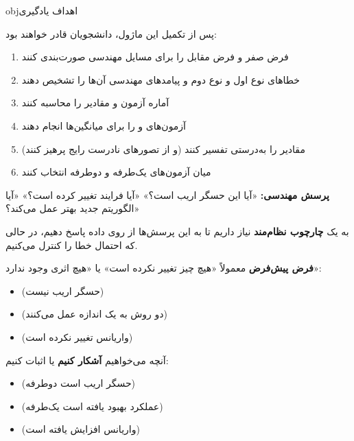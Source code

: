 \begin{PSbox}[unbreakable]{obj}{اهداف یادگیری}

پس از تکمیل این ماژول، دانشجویان قادر خواهند بود:

\begin{enumerate}
\def\labelenumi{\arabic{enumi}.}
\tightlist
\item
  فرض صفر و فرض مقابل را برای مسایل مهندسی صورت‌بندی کنند
\item
  خطاهای نوع اول و نوع دوم و پیامدهای مهندسی آن‌ها را تشخیص دهند
\item
  آماره آزمون و مقادیر  را محاسبه کنند
\item
  آزمون‌های  و  را برای میانگین‌ها انجام دهند
\item
  مقادیر  را به‌درستی تفسیر کنند (و از تصورهای نادرست رایج پرهیز کنند)
\item
  میان آزمون‌های یک‌طرفه و دوطرفه انتخاب کنند
\end{enumerate}

\end{PSbox}


\textbf{پرسش مهندسی:} «آیا این حسگر اریب است؟» «آیا فرایند تغییر کرده است؟» «آیا الگوریتم جدید بهتر عمل می‌کند؟»

به یک \textbf{چارچوب نظام‌مند} نیاز داریم تا به این پرسش‌ها از روی داده پاسخ دهیم، در حالی که احتمال خطا را کنترل می‌کنیم.



\textbf{فرض پیش‌فرض}  معمولاً «هیچ چیز تغییر نکرده است» یا «هیچ اثری وجود ندارد»:

\begin{itemize}
\tightlist
\item
   (حسگر اریب نیست)
\item
   (دو روش به یک اندازه عمل می‌کنند)
\item
   (واریانس تغییر نکرده است)
\end{itemize}


آنچه می‌خواهیم \textbf{آشکار کنیم} یا اثبات کنیم:

\begin{itemize}
\tightlist
\item
   (حسگر اریب است  دوطرفه)
\item
   (عملکرد بهبود یافته است  یک‌طرفه)
\item
   (واریانس افزایش یافته است)
\end{itemize}

